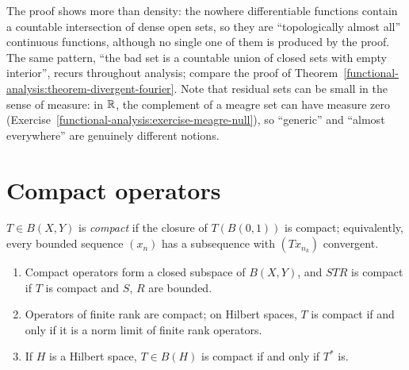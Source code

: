The proof shows more than density: the nowhere differentiable functions contain a countable intersection of dense open sets, so they are ``topologically almost all'' continuous functions, although
no single one of them is produced by the proof. The same pattern, ``the bad set is a countable union of closed sets with empty interior'', recurs throughout analysis; compare the proof of
Theorem~\ref{functional-analysis:theorem-divergent-fourier}. Note that residual sets can be small in the sense of measure: in $\mathbb{R}$, the complement of a meagre set can have measure zero
(Exercise~\ref{functional-analysis:exercise-meagre-null}), so ``generic'' and ``almost everywhere'' are genuinely different notions.

\section{Compact operators}\label{functional-analysis:section-compact-operators}

\begin{definition}\label{functional-analysis:definition-compact-operator}
$T \in B(X, Y)$ is \emph{compact} if the closure of $T(B(0,1))$ is compact; equivalently, every bounded sequence $(x_n)$ has a subsequence with $(Tx_{n_k})$ convergent.
\end{definition}

\begin{proposition}\label{functional-analysis:proposition-compact-operators}
\begin{enumerate}
\item Compact operators form a closed subspace of $B(X, Y)$, and $STR$ is compact if $T$ is compact and $S$, $R$ are bounded.
\item Operators of finite rank are compact; on Hilbert spaces, $T$ is compact if and only if it is a norm limit of finite rank operators.
\item If $H$ is a Hilbert space, $T \in B(H)$ is compact if and only if $T^*$ is.
\end{enumerate}
\end{proposition}

